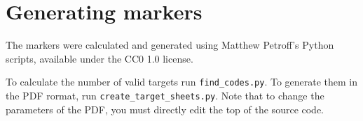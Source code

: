 \chapter{Generating markers}

The markers were calculated and generated using Matthew Petroff's Python scripts, available under the CC0 1.0 license.

To calculate the number of valid targets run \verb|find_codes.py|. To generate them in the PDF rormat, run \verb|create_target_sheets.py|. Note that to change the parameters of the PDF, you must directly edit the top of the source code.


%
%
%
